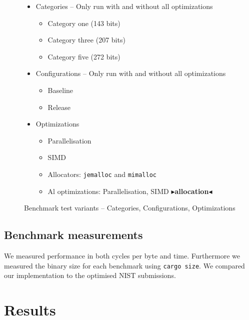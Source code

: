 \documentclass[twoside,11pt]{report}
\theoremstyle{definition}
\theoremstyle{plain}
\newcommand{\todo}[1]{{\color[rgb]{.5,0,0}\textbf{$\blacktriangleright$#1$\blacktriangleleft$}}}
\begin{document}
\begin{figure}
  \begin{itemize}
    \item Categories -- Only run with and without all optimizations
          \begin{itemize}
            \item Category one (143 bits)
            \item Category three (207 bits)
            \item Category five (272 bits)
          \end{itemize}
    \item Configurations -- Only run with and without all optimizations
          \begin{itemize}
            \item Baseline
            \item Release
          \end{itemize}
    \item Optimizations
          \begin{itemize}
            \item Parallelisation
            \item SIMD
            \item Allocators: \texttt{jemalloc} and \texttt{mimalloc}
            \item Al optimizations: Parallelisation, SIMD \todo{allocation}
          \end{itemize}
  \end{itemize}
  \caption{Benchmark test variants -- Categories, Configurations, Optimizations}
\end{figure}

\subsection{Benchmark measurements}\label{sub:bench_measurements}
We measured performance in both cycles per byte and time. Furthermore we measured the binary size for each benchmark using \texttt{cargo size}. We compared our implementation to the optimised NIST submissions.

\section{Results}\label{sub:results}
\end{document}
